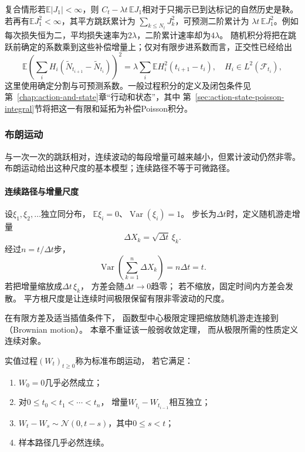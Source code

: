 复合情形若\(\mathbb E|J_1|<\infty\)，则
\(C_t-\lambda t\,\mathbb EJ_1\)相对于只揭示已到达标记的自然历史是鞅。
若再有\(\mathbb EJ_1^2<\infty\)，其平方跳跃累计为
\(\sum_{k\leq N_t}J_k^2\)，可预测二阶累计为
\(\lambda t\,\mathbb EJ_1^2\)。例如每次损失恒为二，平均损失速率为\(2\lambda\)，二阶累计速率却为\(4\lambda\)。
随机积分将把在跳跃前确定的系数乘到这些补偿增量上；仅对有限步进系数而言，正交性已经给出
\[
\mathbb E\left(\sum_iH_i
(\widetilde N_{t_{i+1}}-\widetilde N_{t_i})\right)^2
=\lambda\sum_i\mathbb E H_i^2(t_{i+1}-t_i),
\quad H_i\in L^2(\mathcal F_{t_i}),
\]
这里使用确定分割与可预测系数。一般过程积分的定义及闭包条件见
第~\ref{chap:action-and-state}章“行动和状态”，其中
第~\ref{sec:action-state-poisson-integral}节将把这一有限和延拓为补偿Poisson积分。

\subsubsection{布朗运动}
\label{sec:dynamical-brownian-motion}
与一次一次的跳跃相对，连续波动的每段增量可越来越小，但累计波动仍然非零。布朗运动给出这种尺度的基本模型；连续路径不等于可微路径。

\paragraph{连续路径与增量尺度}

设$\xi_{1},\xi_{2},\ldots$独立同分布， $\mathbb{E}\xi_{i}=0$、$\operatorname{Var}
(\xi_{i})=1$。 步长为$\Delta t$时，定义随机游走增量
\[
	\Delta X_{k}=\sqrt{\Delta t}\,\xi_{k}.
\]
经过$n=t/\Delta t$步，
\[
	\operatorname{Var}\left( \sum_{k=1}^{n}\Delta X_{k}\right) = n\Delta t=t.
\]
若把增量缩放成$\Delta t\,\xi_{k}$， 方差会随$\Delta t\to0$趋零；
若不缩放，固定时间内方差会发散。
平方根尺度是让连续时间极限保留有限非零波动的尺度。

在有限方差及适当插值条件下， 函数型中心极限定理把缩放随机游走连接到（Brownian motion）。 本章不重证该一般弱收敛定理，
而从极限所需的性质定义连续对象。

\begin{definition}[标准布朗运动]
	\label{def:dynamical-standard-brownian-motion} 实值过程$(W_{t})_{t\geq0}$称为标准布朗运动，
	若它满足：
	\begin{enumerate}
		\item $W_{0}=0$几乎必然成立；

		\item 对$0\leq t_{0}<t_{1}<\cdots<t_{n}$， 增量$W_{t_i}-W_{t_{i-1}}$相互独立；

		\item $W_{t}-W_{s}\sim\mathcal{N}(0,t-s)$，其中$0\leq s<t$；

		\item 样本路径几乎必然连续。
	\end{enumerate}
\end{definition}

